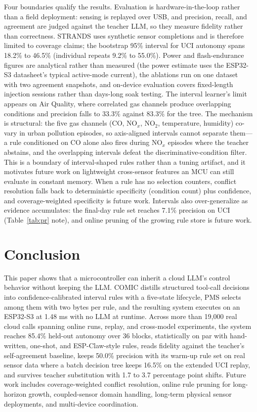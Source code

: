\documentclass[review]{elsarticle}
\begin{document}
Four boundaries qualify the results. Evaluation is hardware-in-the-loop
rather than a field deployment: sensing is replayed over USB, and precision,
recall, and agreement are judged against the teacher LLM, so they measure
fidelity rather than correctness. STRANDS uses synthetic sensor completions
and is therefore limited to coverage claims; the bootstrap 95\% interval for
UCI autonomy spans 18.2\% to 46.5\% (individual repeats 9.2\% to 55.0\%).
Power and flash-endurance figures are analytical rather than measured (the
power estimate uses the ESP32-S3 datasheet's typical active-mode current),
the ablations run on one dataset with two agreement snapshots, and on-device
evaluation covers fixed-length injection sessions rather than days-long soak
testing. The interval learner's limit appears on Air Quality, where
correlated gas channels produce overlapping conditions and precision falls to
33.3\% against 83.3\% for the tree. The mechanism is structural: the five gas
channels (CO, NO$_x$, NO$_2$, temperature, humidity) co-vary in urban
pollution episodes, so axis-aligned intervals cannot separate them---a rule
conditioned on CO alone also fires during NO$_x$ episodes where the teacher
abstains, and the overlapping intervals defeat the discriminative-condition
filter. This is a boundary of interval-shaped rules rather than a tuning
artifact, and it motivates future work on lightweight cross-sensor features
an MCU can still evaluate in constant memory.
When a rule has no selection counters, conflict resolution falls back to
deterministic specificity (condition count) plus confidence, and
coverage-weighted specificity is future work. Intervals also over-generalize
as evidence accumulates: the final-day rule set reaches 7.1\% precision on
UCI (Table~\ref{tab:pr} note), and online pruning of the growing rule store
is future work.

\section{Conclusion}

This paper shows that a microcontroller can inherit a cloud LLM's control
behavior without keeping the LLM. COMIC distills structured tool-call
decisions into confidence-calibrated interval rules with a five-state
lifecycle, PMS selects among them with two bytes per rule, and the resulting
system executes on an ESP32-S3 at 1.48 ms with no LLM at runtime. Across more
than 19,000 real cloud calls spanning online runs, replay, and cross-model
experiments, the system reaches 85.4\% held-out autonomy over 36 blocks,
statistically on par with hand-written, one-shot, and ESP-Claw-style rules,
reads fidelity against the teacher's self-agreement baseline, keeps 50.0\%
precision with its warm-up rule set on real sensor data where a batch
decision tree keeps 16.5\% on the extended UCI replay, and survives teacher
substitution with 1.7 to 3.7 percentage point shifts. Future work includes
coverage-weighted conflict resolution, online rule pruning for long-horizon
growth, coupled-sensor domain handling, long-term physical sensor
deployments, and multi-device coordination.
\end{document}
